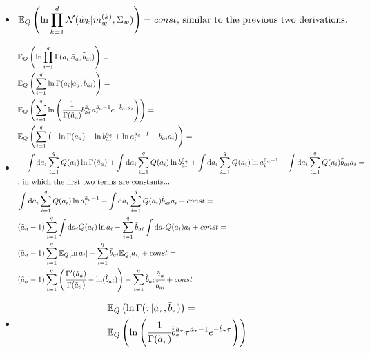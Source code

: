 \documentclass[11pt,notitlepage]{article}
\begin{document}
\begin{itemize}
\begin{equation*}
\end{equation*}
\item
\begin{equation*}
\mathbb{E}_Q \left( \ln \prod_{k=1}^d \mathcal{N} (\tilde{w}_k|m_w^{(k)},\Sigma_w)\right) =  const\text{, similar to the previous two derivations.} \\
\end{equation*}
\item
\begin{align*}
& \mathbb{E}_Q \left( \ln \prod_{i=1}^q \Gamma (a_i | \tilde{a}_a, \tilde{b}_{ai})\right)= \\
& \mathbb{E}_Q\left( \sum_{i=1}^q \ln \Gamma (a_i | \tilde{a}_a, \tilde{b}_{ai}) \right) =\\
& \mathbb{E}_Q\left( \sum_{i=1}^q \ln \left( \cfrac{1}{\Gamma(\tilde{a}_a)} b_{\tilde{a}i}^{\tilde{a}_a} a_i^{\tilde{a}_a -1} e^{-\tilde{b}_{ai}a_i} \right) \right)=\\
& \mathbb{E}_Q\left( \sum_{i=1}^q \left( - \ln\Gamma(\tilde{a}_a) +\ln b_{\tilde{a}i}^{\tilde{a}_a} +\ln a_i^{\tilde{a}_a -1} - \tilde{b}_{ai}a_i  \right) \right)=\\
& -\int \mathrm{d}a_i \sum_{i=1}^q  Q(a_i) \ln\Gamma(\tilde{a}_a) + \int \mathrm{d}a_i \sum_{i=1}^q  Q(a_i) \ln b_{\tilde{a}i}^{\tilde{a}_a} + \int \mathrm{d}a_i \sum_{i=1}^q  Q(a_i) \ln a_i^{\tilde{a}_a -1} - \int \mathrm{d}a_i \sum_{i=1}^q  Q(a_i) \tilde{b}_{ai}a_i =\\
&\text{, in which the first two terms are constants...}\\
&\int \mathrm{d}a_i \sum_{i=1}^q  Q(a_i) \ln a_i^{\tilde{a}_a -1} - \int \mathrm{d}a_i \sum_{i=1}^q  Q(a_i) \tilde{b}_{ai}a_i +const=\\
& (\tilde{a}_a -1)\sum_{i=1}^q \int \mathrm{d}a_i   Q(a_i) \ln a_i - \sum_{i=1}^q \tilde{b}_{ai} \int \mathrm{d}a_i  Q(a_i) a_i +const=\\
&(\tilde{a}_a -1)\sum_{i=1}^q \mathbb{E}_Q[\ln a_i]  - \sum_{i=1}^q \tilde{b}_{ai} \mathbb{E}_Q[a_i]+const  =\\
& (\tilde{a}_a -1)\sum_{i=1}^q \left( \cfrac{\Gamma'(\tilde{a}_a)}{\Gamma(\tilde{a}_a)} - \ln(\tilde{b}_{ai})\right)  - \sum_{i=1}^q \tilde{b}_{ai} \cfrac{\tilde{a}_a}{\tilde{b}_{ai}} +const
\end{align*}
\item
\begin{align*}
&\mathbb{E}_Q \left( \ln \Gamma (\tau | \tilde{a}_{\tau}, \tilde{b}_{\tau})\right) = \\
&\mathbb{E}_Q \left( \ln \left( \cfrac{1}{\Gamma(\tilde{a}_{\tau})} \tilde{b}_{\tau}^{\tilde{a}_{\tau}} \tau^{\tilde{a}_{\tau} -1 } e^{-\tilde{b}_{\tau} \tau} \right) \right) = \\

\end{align*}
\end{itemize}
\end{document}
